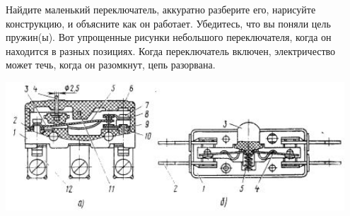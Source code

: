 
Найдите маленький переключатель, аккуратно разберите его, нарисуйте конструкцию,
и объясните как он работает. Убедитесь, что вы поняли цель пружин(ы).
Вот упрощенные рисунки небольшого переключателя, когда он находится в разных
позициях. Когда переключатель включен, электричество может течь, когда он
разомкнут, цепь разорвана.

\noindent\includegraphics[width=0.95\textwidth]{bcollis/switch.jpg}
